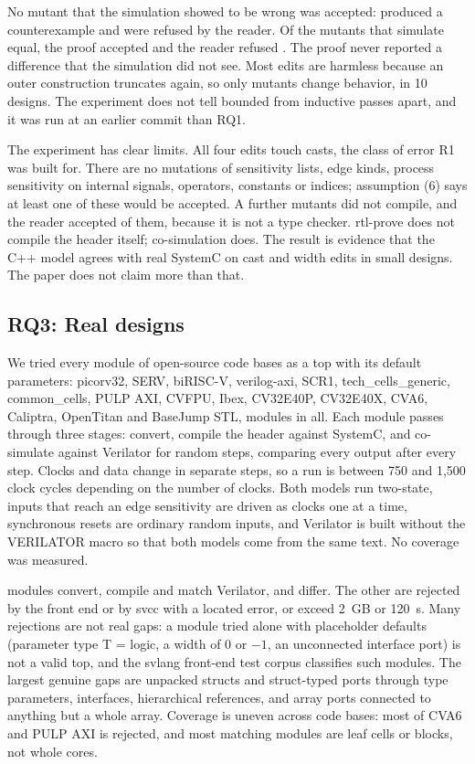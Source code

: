 \documentclass[conference]{IEEEtran}
\newcommand{\code}[1]{{\fontshape{n}\ttfamily #1}}
\begin{document}
No mutant that the simulation showed to be wrong was accepted: \nMutProofFinds{} produced a
counterexample and \nMutReaderRejects{} were refused by the reader. Of the \nMutSimEqual{} mutants
that simulate equal, the proof accepted \nMutEqualAccepted{} and the reader refused
\nMutEqualRefused{}. The proof never reported a difference that the simulation did not see. Most
edits are harmless because an outer construction truncates again, so only \nMutSimDiffers{}
mutants change behavior, in 10 designs. The experiment does not tell bounded from inductive passes
apart, and it was run at an earlier commit than RQ1.

The experiment has clear limits. All four edits touch casts, the class of error R1 was built for.
There are no mutations of sensitivity lists, edge kinds, process sensitivity on internal signals,
operators, constants or indices; assumption (6) says at least one of these would be accepted. A
further \nMutNoCompile{} mutants did not compile, and the reader accepted \nMutNoCompileRead{} of
them, because it is not a type checker. \code{rtl-prove} does not compile the header itself;
co-simulation does. The result is evidence that the C++ model agrees with real SystemC on cast
and width edits in small designs. The paper does not claim more than that.

\subsection{RQ3: Real designs}
\label{sec:stress}

We tried every module of \nCodeBases{} open-source code bases as a top with its default
parameters: picorv32, SERV, biRISC-V, verilog-axi, SCR1, tech\_cells\_generic, common\_cells,
PULP AXI, CVFPU, Ibex, CV32E40P, CV32E40X, CVA6, Caliptra, OpenTitan and BaseJump STL, \nModules{}
modules in all. Each module passes through three stages: convert, compile the header against
SystemC, and co-simulate against Verilator for \nSteps{} random steps, comparing every output after
every step. Clocks and data change in separate steps, so a run is between 750 and 1,500 clock
cycles depending on the number of clocks. Both models run two-state, inputs that reach an edge
sensitivity are driven as clocks one at a time, synchronous resets are ordinary random inputs, and
Verilator is built without the \code{VERILATOR} macro so that both models come from the same text.
No coverage was measured.

\nMatch{} modules convert, compile and match Verilator, and \nMismatch{} differ. The other
\nRejected{} are rejected by the front end or by \code{svcc} with a located error, or exceed 2~GB or
120~s. Many rejections are not real gaps: a module tried alone with placeholder defaults
(\code{parameter type T = logic}, a width of 0 or $-1$, an unconnected interface port) is not a valid
top, and the \code{svlang} front-end test corpus classifies \nPlaceholder{} such modules. The
largest genuine gaps are unpacked structs and struct-typed ports through type parameters,
interfaces, hierarchical references, and array ports connected to anything but a whole array.
Coverage is uneven across code bases: most of CVA6 and PULP AXI is rejected, and most matching
modules are leaf cells or blocks, not whole cores.
\end{document}
